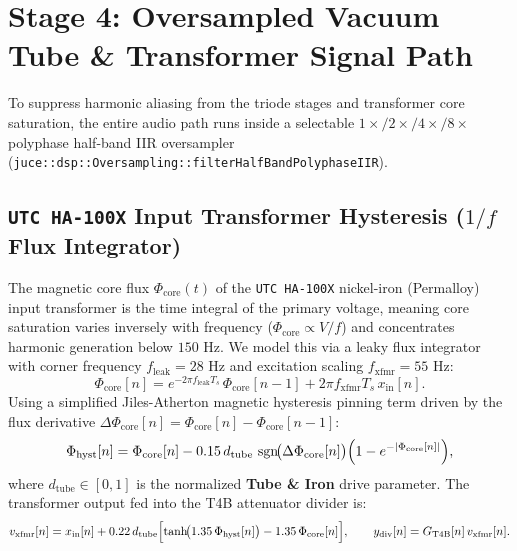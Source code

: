 \documentclass[11pt,a4paper]{article}
\begin{document}
\section{Stage 4: Oversampled Vacuum Tube \& Transformer Signal Path}

To suppress harmonic aliasing from the triode stages and transformer core saturation, the entire audio path runs inside a selectable $1\times / 2\times / 4\times / 8\times$ polyphase half-band IIR oversampler (\texttt{juce::dsp::Oversampling::filterHalfBandPolyphaseIIR}).

\subsection{\texttt{UTC HA-100X} Input Transformer Hysteresis (\texorpdfstring{$1/f$}{1/f} Flux Integrator)}

The magnetic core flux $\Phi_{\text{core}}(t)$ of the \texttt{UTC HA-100X} nickel-iron (Permalloy) input transformer is the time integral of the primary voltage, meaning core saturation varies inversely with frequency ($\Phi_{\text{core}} \propto V / f$) and concentrates harmonic generation below $150\text{ Hz}$. We model this via a leaky flux integrator with corner frequency $f_{\text{leak}} = 28\text{ Hz}$ and excitation scaling $f_{\text{xfmr}} = 55\text{ Hz}$:
\begin{equation}
    \Phi_{\text{core}}[n] = e^{-2\pi f_{\text{leak}} T_s}\,\Phi_{\text{core}}[n-1] + 2\pi f_{\text{xfmr}} T_s\,x_{\text{in}}[n].
\end{equation}
Using a simplified Jiles-Atherton magnetic hysteresis pinning term driven by the flux derivative $\Delta \Phi_{\text{core}}[n] = \Phi_{\text{core}}[n] - \Phi_{\text{core}}[n-1]$:
\begin{equation}
    \Phi_{\text{hyst}}[n] = \Phi_{\text{core}}[n] - 0.15\,d_{\text{tube}}\,\operatorname{sgn}\!\bigl(\Delta\Phi_{\text{core}}[n]\bigr)\Bigl(1 - e^{-|\Phi_{\text{core}}[n]|}\Bigr),
\end{equation}
where $d_{\text{tube}} \in [0, 1]$ is the normalized \textbf{Tube \& Iron} drive parameter. The transformer output fed into the T4B attenuator divider is:
\begin{equation}
    v_{\text{xfmr}}[n] = x_{\text{in}}[n] + 0.22\,d_{\text{tube}}\Bigl[\tanh\!\bigl(1.35\,\Phi_{\text{hyst}}[n]\bigr) - 1.35\,\Phi_{\text{core}}[n]\Bigr], \qquad
    y_{\text{div}}[n] = G_{\text{T4B}}[n]\,v_{\text{xfmr}}[n].
\end{equation}
\end{document}
